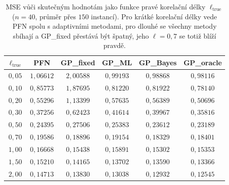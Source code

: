 \begin{table}[H]
\centering
\begin{tabular}{cccccc}
\hline
$\ell_{\text{true}}$ & PFN & GP\_fixed & GP\_ML & GP\_Bayes & GP\_oracle \\
\hline
$0{,}05$ & $1{,}06612$ & $2{,}00588$ & $0{,}99193$ & $0{,}98868$ & $0{,}98116$ \\
$0{,}10$ & $0{,}85773$ & $1{,}87695$ & $0{,}81220$ & $0{,}81922$ & $0{,}78140$ \\
$0{,}20$ & $0{,}55296$ & $1{,}13399$ & $0{,}57635$ & $0{,}56389$ & $0{,}50696$ \\
$0{,}30$ & $0{,}37256$ & $0{,}62423$ & $0{,}41614$ & $0{,}39967$ & $0{,}35816$ \\
$0{,}50$ & $0{,}24395$ & $0{,}27506$ & $0{,}25383$ & $0{,}23612$ & $0{,}23189$ \\
$0{,}70$ & $0{,}19586$ & $0{,}18896$ & $0{,}19154$ & $0{,}18329$ & $0{,}18401$ \\
$1{,}00$ & $0{,}16668$ & $0{,}15438$ & $0{,}15891$ & $0{,}15302$ & $0{,}15353$ \\
$1{,}50$ & $0{,}15210$ & $0{,}14165$ & $0{,}13702$ & $0{,}13590$ & $0{,}13366$ \\
$2{,}00$ & $0{,}14713$ & $0{,}13830$ & $0{,}13038$ & $0{,}12932$ & $0{,}12545$ \\
\hline
\end{tabular}
\caption{MSE vůči skutečným hodnotám jako funkce pravé korelační délky $\ell_{\text{true}}$ ($n = 40$, průměr přes $150$ instancí). Pro krátké korelační délky vede PFN spolu s adaptivními metodami, pro dlouhé se všechny metody sbíhají a GP\_fixed přestává být špatný, jeho $\ell = 0{,}7$ se totiž blíží pravdě.}
\label{tab:exp7_mse_ls}
\end{table}

